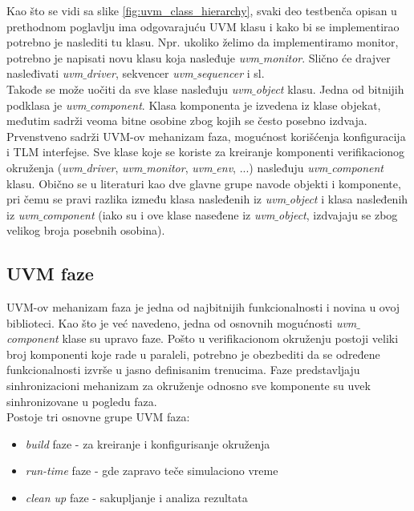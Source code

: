 Kao što se vidi sa slike \ref{fig:uvm_class_hierarchy}, svaki deo testbenča
opisan u prethodnom poglavlju ima odgovarajuću UVM klasu i kako bi se
implementirao potrebno je naslediti tu klasu.
Npr. ukoliko želimo da implementiramo monitor, potrebno je napisati novu klasu
koja nasleđuje \emph{uvm\(\_\)monitor}.
Slično će drajver nasleđivati \emph{uvm\(\_\)driver}, sekvencer
\emph{uvm\(\_\)sequencer} i sl.\\

Takođe se može uočiti da sve klase nasleđuju \emph{uvm\(\_\)object} klasu.
Jedna od bitnijih podklasa je \emph{uvm\(\_\)component}. Klasa komponenta je
izvedena iz klase objekat, međutim sadrži veoma bitne osobine zbog kojih se
često posebno izdvaja. Prvenstveno sadrži UVM-ov mehanizam faza, mogućnost
korišćenja konfiguracija i TLM interfejse. Sve klase koje se koriste za
kreiranje komponenti verifikacionog okruženja (\emph{uvm\(\_\)driver},
\emph{uvm\(\_\)monitor}, \emph{uvm\(\_\)env}, ...) nasleđuju
\emph{uvm\(\_\)component} klasu. Obično se u literaturi kao dve glavne grupe
navode objekti i komponente, pri čemu se pravi razlika između klasa nasleđenih
iz \emph{uvm\(\_\)object} i klasa nasleđenih iz \emph{uvm\(\_\)component} (iako
su i ove klase naseđene iz \emph{uvm\(\_\)object}, izdvajaju se zbog velikog
broja posebnih osobina).


\subsection{UVM faze}

UVM-ov mehanizam faza je jedna od najbitnijih funkcionalnosti i novina u ovoj
biblioteci. Kao što je već navedeno, jedna od osnovnih mogućnosti
\emph{uvm\(\_\)component} klase su upravo faze. Pošto u verifikacionom okruženju
postoji veliki broj komponenti koje rade u paraleli, potrebno je obezbediti da
se određene funkcionalnosti izvrše u jasno definisanim trenucima. Faze
predstavljaju sinhronizacioni mehanizam za okruženje odnosno sve komponente su
uvek sinhronizovane u pogledu faza.\\

Postoje tri osnovne grupe UVM faza:
\begin{itemize}
\item \emph{build} faze - za kreiranje i konfigurisanje okruženja
\item \emph{run-time} faze - gde zapravo teče simulaciono vreme
\item \emph{clean up} faze - sakupljanje i analiza rezultata
\end{itemize}

